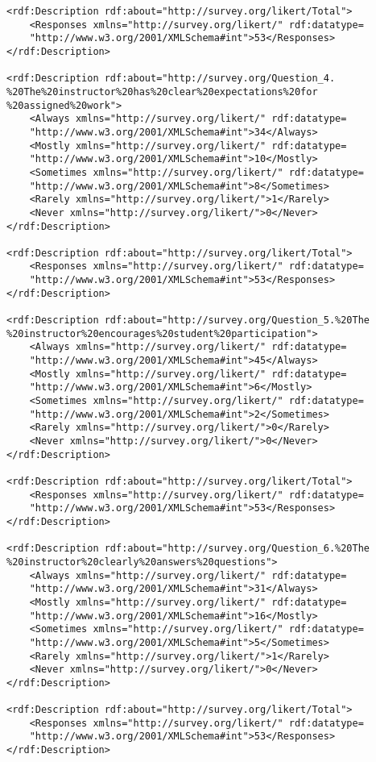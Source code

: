 \begin{lstlisting}
<rdf:Description rdf:about="http://survey.org/likert/Total">
	<Responses xmlns="http://survey.org/likert/" rdf:datatype=
	"http://www.w3.org/2001/XMLSchema#int">53</Responses>
</rdf:Description>

<rdf:Description rdf:about="http://survey.org/Question_4.
%20The%20instructor%20has%20clear%20expectations%20for
%20assigned%20work">
	<Always xmlns="http://survey.org/likert/" rdf:datatype=
	"http://www.w3.org/2001/XMLSchema#int">34</Always>
	<Mostly xmlns="http://survey.org/likert/" rdf:datatype=
	"http://www.w3.org/2001/XMLSchema#int">10</Mostly>
	<Sometimes xmlns="http://survey.org/likert/" rdf:datatype=
	"http://www.w3.org/2001/XMLSchema#int">8</Sometimes>
	<Rarely xmlns="http://survey.org/likert/">1</Rarely>
	<Never xmlns="http://survey.org/likert/">0</Never>
</rdf:Description>

<rdf:Description rdf:about="http://survey.org/likert/Total">
	<Responses xmlns="http://survey.org/likert/" rdf:datatype=
	"http://www.w3.org/2001/XMLSchema#int">53</Responses>
</rdf:Description>

<rdf:Description rdf:about="http://survey.org/Question_5.%20The
%20instructor%20encourages%20student%20participation">
	<Always xmlns="http://survey.org/likert/" rdf:datatype=
	"http://www.w3.org/2001/XMLSchema#int">45</Always>
	<Mostly xmlns="http://survey.org/likert/" rdf:datatype=
	"http://www.w3.org/2001/XMLSchema#int">6</Mostly>
	<Sometimes xmlns="http://survey.org/likert/" rdf:datatype=
	"http://www.w3.org/2001/XMLSchema#int">2</Sometimes>
	<Rarely xmlns="http://survey.org/likert/">0</Rarely>
	<Never xmlns="http://survey.org/likert/">0</Never>
</rdf:Description>

<rdf:Description rdf:about="http://survey.org/likert/Total">
	<Responses xmlns="http://survey.org/likert/" rdf:datatype=
	"http://www.w3.org/2001/XMLSchema#int">53</Responses>
</rdf:Description>

<rdf:Description rdf:about="http://survey.org/Question_6.%20The
%20instructor%20clearly%20answers%20questions">
	<Always xmlns="http://survey.org/likert/" rdf:datatype=
	"http://www.w3.org/2001/XMLSchema#int">31</Always>
	<Mostly xmlns="http://survey.org/likert/" rdf:datatype=
	"http://www.w3.org/2001/XMLSchema#int">16</Mostly>
	<Sometimes xmlns="http://survey.org/likert/" rdf:datatype=
	"http://www.w3.org/2001/XMLSchema#int">5</Sometimes>
	<Rarely xmlns="http://survey.org/likert/">1</Rarely>
	<Never xmlns="http://survey.org/likert/">0</Never>
</rdf:Description>

<rdf:Description rdf:about="http://survey.org/likert/Total">
	<Responses xmlns="http://survey.org/likert/" rdf:datatype=
	"http://www.w3.org/2001/XMLSchema#int">53</Responses>
</rdf:Description>


\end{lstlisting}
